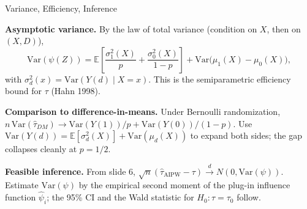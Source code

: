 \documentclass[aspectratio=169, handout, t]{beamer}
\begin{document}
\begin{frame}{Variance, Efficiency, Inference}

\textbf{Asymptotic variance.}  By the law of total variance (condition on $X$, then on $(X, D)$),
$$\mathrm{Var}(\psi(Z)) = \mathbb{E}\!\left[\frac{\sigma_1^2(X)}{p} + \frac{\sigma_0^2(X)}{1-p}\right] + \mathrm{Var}\big(\mu_1(X) - \mu_0(X)\big),$$
with $\sigma_d^2(x) = \mathrm{Var}(Y(d)\mid X = x)$.  This is the semiparametric efficiency bound for $\tau$ (Hahn 1998).

\smallskip
\textbf{Comparison to difference-in-means.}  Under Bernoulli randomization, $n\,\mathrm{Var}(\hat\tau_{DM}) \to \mathrm{Var}(Y(1))/p + \mathrm{Var}(Y(0))/(1-p)$.  Use $\mathrm{Var}(Y(d)) = \mathbb{E}[\sigma_d^2(X)] + \mathrm{Var}(\mu_d(X))$ to expand both sides; the gap collapses cleanly at $p = 1/2$.

\smallskip
\textbf{Feasible inference.}  From slide 6, $\sqrt n (\hat\tau_{\mathrm{AIPW}} - \tau) \xrightarrow{d} N(0, \mathrm{Var}(\psi))$.  Estimate $\mathrm{Var}(\psi)$ by the empirical second moment of the plug-in influence function $\hat\psi_i$; the 95\% CI and the Wald statistic for $H_0: \tau = \tau_0$ follow.

\end{frame}
\end{document}

